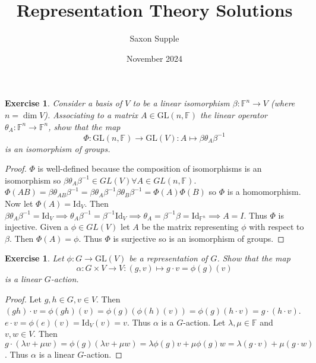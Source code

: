 \documentclass{article}
\title{Representation Theory Solutions}
\author{Saxon Supple}
\date{November 2024}
\newtheorem{exercise}[theorem]{Exercise}
\begin{document}
\maketitle

\begin{exercise}
Consider a basis of $V$ to be a linear isomorphism $\beta : \mathbb{F}^n \to V$ (where $n = \dim V$). Associating to a matrix $A \in \mathrm{GL}(n, \mathbb{F})$ the linear operator $\theta_A : \mathbb{F}^n \to \mathbb{F}^n$, show that the map
\[
\Phi : \mathrm{GL}(n, \mathbb{F}) \to \mathrm{GL}(V) : A \mapsto \beta \theta_A \beta^{-1}
\]
is an isomorphism of groups.
\end{exercise}
\begin{proof}
$\Phi$ is well-defined because the composition of isomorphisms is an isomorphism so $\beta\theta_A\beta^{-1}\in GL(V)\forall A\in GL(n,\mathbb{F})$. $\Phi(AB)=\beta \theta_{AB}\beta^{-1}=\beta \theta_{A}\beta^{-1}\beta \theta_{B}\beta^{-1}=\Phi(A)\Phi(B)$ so $\Phi$ is a homomorphism. Now let $\Phi(A)=\text{Id}_V$. Then $\beta \theta_A\beta^{-1}=\text{Id}_V\implies \theta_A\beta^{-1}=\beta^{-1}\text{Id}_V\implies \theta_A=\beta^{-1}\beta=\text{Id}_{\mathbb{F}^n}\implies A=I$. Thus $\Phi$ is injective. Given a $\phi\in GL(V)$ let $A$ be the matrix representing $\phi$ with respect to $\beta$. Then $\Phi(A)=\phi$. Thus $\Phi$ is surjective so is an isomorphism of groups.
\end{proof}

\begin{exercise}
Let $\phi: G \to \mathrm{GL}(V)$ be a representation of $G$. Show that the map
\[
\alpha: G \times V \to V : (g, v) \mapsto g \cdot v = \phi(g)(v)
\]
is a linear $G$-action.
\end{exercise}
\begin{proof}
Let $g,h\in G,v\in V$. Then $(gh)\cdot v=\phi(gh)(v)=\phi(g)(\phi(h)(v))=\phi(g)(h\cdot v)=g\cdot(h\cdot v)$.
$e\cdot v=\phi(e)(v)=\text{Id}_V(v)=v$. Thus $\alpha$ is a $G$-action.
Let $\lambda,\mu\in\mathbb{F}$ and $v,w\in V$. Then $g\cdot(\lambda v+\mu w)=\phi(g)(\lambda v+\mu w)=\lambda\phi(g)v+\mu\phi(g)w=\lambda(g\cdot v)+\mu(g\cdot w)$. Thus $\alpha$ is a linear $G$-action.
\end{proof}
\end{document}
